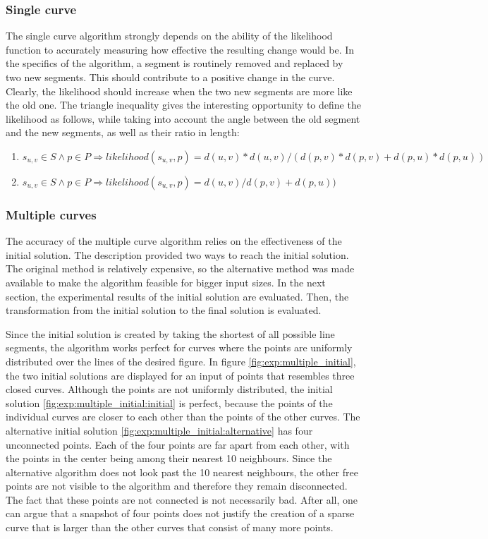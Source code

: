 \documentclass[11pt]{article}
\begin{document}
\subsubsection{Single curve}
The single curve algorithm strongly depends on the ability of the likelihood function to accurately measuring how effective the resulting change would be. In the specifics of the algorithm, a segment is routinely removed and replaced by two new segments. This should contribute to a positive change in the curve. Clearly, the likelihood should increase when the two new segments are more like the old one. The triangle inequality gives the interesting opportunity to define the likelihood as follows, while taking into account the angle between the old segment and the new segments, as well as their ratio in length:

\noindent
\begin{enumerate}
\topsep=0pt
\itemsep=0pt
\parsep=0pt
\item $s_{u,v} \in S \wedge p \in P \Rightarrow likelihood(s_{u,v}, p) = d(u, v)*d(u, v)/(d(p, v)*d(p, v)+d(p, u)*d(p, u))$
\item $s_{u,v} \in S \wedge p \in P \Rightarrow likelihood(s_{u,v}, p) = d(u, v)/d(p, v)+d(p, u))$
\end{enumerate}

\subsubsection{Multiple curves}
The accuracy of the multiple curve algorithm relies on the effectiveness of the initial solution. The description provided two ways to reach the initial solution. The original method is relatively expensive, so the alternative method was made available to make the algorithm feasible for bigger input sizes. In the next section, the experimental results of the initial solution are evaluated. Then, the transformation from the initial solution to the final solution is evaluated.

Since the initial solution is created by taking the shortest of all possible line segments, the algorithm works perfect for curves where the points are uniformly distributed over the lines of the desired figure.
In figure \ref{fig:exp:multiple_initial}, the two initial solutions are displayed for an input of points that resembles three closed curves. Although the points are not uniformly distributed, the initial solution \ref{fig:exp:multiple_initial:initial} is perfect, because the points of the individual curves are closer to each other than the points of the other curves.
The alternative initial solution \ref{fig:exp:multiple_initial:alternative} has four unconnected points. Each of the four points are far apart from each other, with the points in the center being among their nearest 10 neighbours. Since the alternative algorithm does not look past the 10 nearest neighbours, the other free points are not visible to the algorithm and therefore they remain disconnected.
The fact that these points are not connected is not necessarily bad. After all, one can argue that a snapshot of four points does not justify the creation of a sparse curve that is larger than the other curves that consist of many more points.
\end{document}
